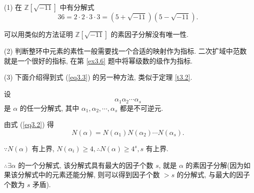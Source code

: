 \documentclass[UTF8]{ctexart}
\begin{document}
\begin{note}
    (1) 在 $\mathbb{Z}[\sqrt{-11}]$ 中有分解式
    \[36=2\cdot2\cdot3\cdot3=(5+\sqrt{-11})(5-\sqrt{-11}).\]

    可以用类似的方法证明 $\mathbb{Z}[\sqrt{-11}]$ 的素因子分解没有唯一性.
    
    (2) 判断整环中元素的素性一般需要找一个合适的映射作为指标. 二次扩域中范数就是一个很好的指标, 在第 \ref{ex3.6} 题中将幂级数的级作为指标.

    (3) 下面介绍得到式 (\ref{eq3.3}) 的另一种方法, 类似于定理 \ref{t3.2}.

    设
    \[\alpha_1\alpha_2\cdots\alpha_s\]
    是 $\alpha$ 的任一分解式, 其中 $\alpha_1,\alpha_2,\cdots,\alpha_s$ 都是不可逆元.

    由式 (\ref{eq3.2}) 得
    \[N(\alpha)=N(\alpha_1)N(\alpha_2)\cdots N(\alpha_s).\]

    $\because N(\alpha)$ 有上界, $N(\alpha_i)\geq4,\therefore N(\alpha)\geq 4^s,s$ 有上界.

    $\therefore\exists\alpha$ 的一个分解式, 该分解式具有最大的因子个数 $s$, 就是 $\alpha$ 的素因子分解(因为如果该分解式中的元素还能分解, 则可以得到因子个数 $>s$ 的分解式, 与最大的因子个数为 $s$ 矛盾).
\end{note}
\end{document}
